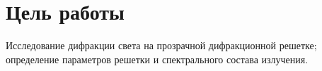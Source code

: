 \section*{Цель работы}
Исследование дифракции света на прозрачной дифракционной решетке; определение параметров решетки и спектрального состава излучения.
